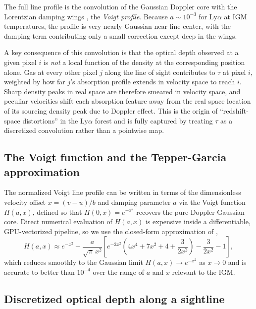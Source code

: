 The full line profile is the convolution of the Gaussian Doppler core with the Lorentzian damping wings , the \emph{Voigt profile}. Because $a\sim10^{-3}$ for Ly$\alpha$ at IGM temperatures, the profile is very nearly Gaussian near line center, with the damping term contributing only a small correction except deep in the wings.

A key consequence of this convolution is that the optical depth observed at a given pixel $i$ is \emph{not} a local function of the density at the corresponding position alone. Gas at every other pixel $j$ along the line of sight contributes to $\tau$ at pixel $i$, weighted by how far $j$'s absorption profile extends in velocity space to reach $i$. Sharp density peaks in real space are therefore smeared in velocity space, and peculiar velocities shift each absorption feature away from the real space location of its sourcing density peak due to Doppler effect. This is the origin of ``redshift-space distortions'' in the Ly$\alpha$ forest and is fully captured by treating $\tau$ as a discretized convolution rather than a pointwise map.

\subsection{The Voigt function and the Tepper-Garcia approximation}
\label{sec:voigt-hjerting}

The normalized Voigt line profile can be written in terms of the dimensionless velocity offset $x=(v-u)/b$ and damping parameter $a$ via the Voigt function $H(a,x)$, defined so that $H(0,x)=e^{-x^2}$ recovers the pure-Doppler Gaussian core. Direct numerical evaluation of $H(a,x)$ is expensive inside a differentiable, GPU-vectorized pipeline, so we use the closed-form approximation of \citet{tepper_2006},
\begin{equation}
H(a,x) \approx e^{-x^2} - \frac{a}{\sqrt{\pi}\,x^2}\left[e^{-2x^2}\!\left(4x^4+7x^2+4+\frac{3}{2x^2}\right)-\frac{3}{2x^2}-1\right],
\label{eq:tepper-garcia}
\end{equation}
which reduces smoothly to the Gaussian limit $H(a,x)\to e^{-x^2}$ as $x\to0$ and is accurate to better than $10^{-4}$ over the range of $a$ and $x$ relevant to the IGM. 

\subsection{Discretized optical depth along a sightline}
\label{sec:tau-discretized}

